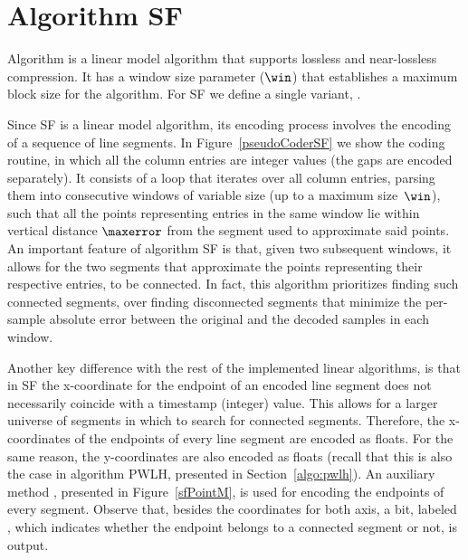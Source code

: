 

\section{Algorithm SF}
\label{algo:sf}


Algorithm \textit{\SFfull} \cite{coder:sf} is a linear model algorithm that supports lossless and near-lossless compression. It has a window size parameter ($\win$) that establishes a maximum block size for the algorithm. For SF we define a single variant, \maskalgo.


Since SF is a linear model algorithm, its encoding process involves the encoding of a sequence of line segments. In Figure~\ref{pseudoCoderSF} we show the coding routine, in which all the column entries are integer values (the gaps are encoded separately). It consists of a loop that iterates over all column entries, parsing them into consecutive windows of variable size (up to a maximum size~$\win$), such that all the points representing entries in the same window lie within vertical distance $\maxerror$ from the segment used to approximate said points. An important feature of algorithm SF is that, given two subsequent windows, it allows for the two segments that approximate the points representing their respective entries, to be connected. In fact, this algorithm prioritizes finding such connected segments, 
over finding disconnected segments that minimize the per-sample absolute error between the original and the decoded samples in each window. 


\vspace{+5pt}



\clearpage


Another key difference with the rest of the implemented linear algorithms, is that in SF the x-coordinate for the endpoint of an encoded line segment does not necessarily coincide with a timestamp (integer) value. This allows for a larger universe of segments in which to search for connected segments. Therefore, the x-coordinates of the endpoints of every line segment are encoded as floats. For the same reason, the y-coordinates are also encoded as floats (recall that this is also the case in algorithm PWLH, presented in Section~\ref{algo:pwlh}). An auxiliary method \SFEncodePoint, presented in Figure~\ref{sfPointM}, is used for encoding the endpoints of every segment. Observe that, besides the coordinates for both axis, a bit, labeled \connectedS, which indicates whether the endpoint belongs to a connected segment or not, is output.



